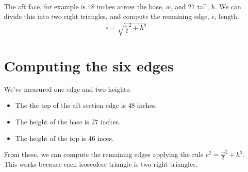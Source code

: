 \documentclass[letterpaper,10pt,english]{sphinxmanual}
\begin{document}
\sphinxAtStartPar
The aft face, for example is 48 inches across the base, \(w\), and 27 tall, \(h\). We can divide this into two right triangles, and compute the remaining edge, \(e\), length.
\begin{equation*}
\begin{split}
e = \sqrt{{\tfrac{w}{2}}^2 + h^2}
\end{split}
\end{equation*}

\section{Computing the six edges}
\label{\detokenize{tetrahedron:computing-the-six-edges}}
\sphinxAtStartPar
We’ve measured one edge and two heights:
\begin{itemize}
\item {} 
\sphinxAtStartPar
The the top of the aft section edge is 48 inches.

\item {} 
\sphinxAtStartPar
The height of the base is 27 inches.

\item {} 
\sphinxAtStartPar
The height of the top is 46 inces.

\end{itemize}

\sphinxAtStartPar
From these, we can compute the remaining edges applying the rule \(e^2 = {\frac{w}{2}}^2 + h^2\). This works because each isoscolese triangle is two right triangles.

\begin{sphinxVerbatim}[commandchars=\\\{\}]
   
       
\end{sphinxVerbatim}

\begin{sphinxVerbatim}[commandchars=\\\{\}]
  

     
  
\end{sphinxVerbatim}
\end{document}
